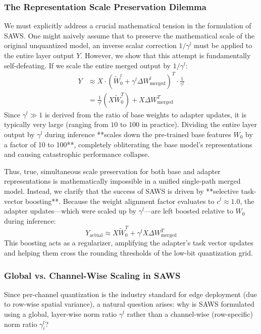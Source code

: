 \subsubsection{The Representation Scale Preservation Dilemma}
We must explicitly address a crucial mathematical tension in the formulation of SAWS. One might naively assume that to preserve the mathematical scale of the original unquantized model, an inverse scalar correction $1/\gamma^l$ must be applied to the entire layer output $Y$. However, we show that this attempt is fundamentally self-defeating. If we scale the entire merged output by $1/\gamma^l$:
\begin{equation}
  \begin{split}
    Y &\approx X \cdot \left( \tilde{W}^l_0 + \gamma^l \Delta W^l_{\text{merged}} \right)^T \cdot \frac{1}{\gamma^l} \\
    &= \frac{1}{\gamma^l} \left( X \tilde{W}_0^T \right) + X \Delta W_{\text{merged}}^T
  \end{split}
\end{equation}
Since $\gamma^l \gg 1$ is derived from the ratio of base weights to adapter updates, it is typically very large (ranging from $10$ to $100$ in practice). Dividing the entire layer output by $\gamma^l$ during inference **scales down the pre-trained base features $W_0$ by a factor of 10 to 100**, completely obliterating the base model's representations and causing catastrophic performance collapse.

Thus, true, simultaneous scale preservation for both base and adapter representations is mathematically impossible in a unified single-path merged model. Instead, we clarify that the success of SAWS is driven by **selective task-vector boosting**. Because the weight alignment factor evaluates to $c^l \approx 1.0$, the adapter updates—which were scaled up by $\gamma^l$—are left boosted relative to $W_0$ during inference:
\begin{equation}
  Y_{\text{actual}} \approx X \tilde{W}_0^T + \gamma^l X \Delta W_{\text{merged}}^T
\end{equation}
This boosting acts as a regularizer, amplifying the adapter's task vector updates and helping them cross the rounding thresholds of the low-bit quantization grid.

\subsubsection{Global vs. Channel-Wise Scaling in SAWS}
Since per-channel quantization is the industry standard for edge deployment (due to row-wise spatial variance), a natural question arises: why is SAWS formulated using a global, layer-wise norm ratio $\gamma^l$ rather than a channel-wise (row-specific) norm ratio $\gamma^l_i$? 


